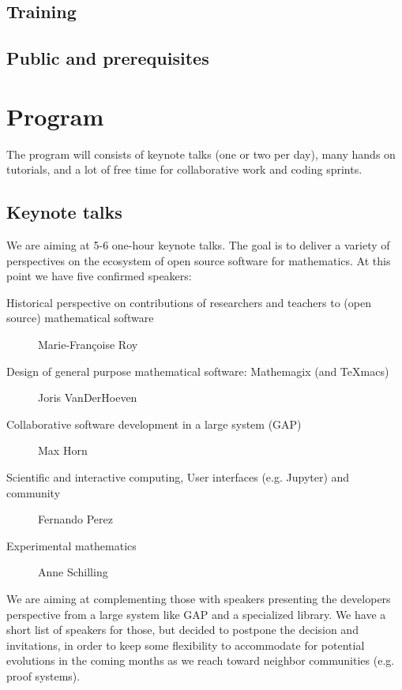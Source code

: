 \documentclass[12pt]{amsbook}
\begin{document}
\subsection{Training}

\subsection{}

\subsection{Public and prerequisites}



\section{Program}

The program will consists of keynote talks (one or two per day), many
hands on tutorials, and a lot of free time for collaborative work and
coding sprints.

\subsection{Keynote talks}

We are aiming at 5-6 one-hour keynote talks. The goal is to deliver a
variety of perspectives on the ecosystem of open source software for
mathematics. At this point we have five confirmed speakers:

\begin{description}
\item[Historical perspective on contributions of researchers and
  teachers to (open source) mathematical software]
  Marie-Françoise Roy
\item[Design of general purpose mathematical software: Mathemagix (and TeXmacs)]
  Joris VanDerHoeven
\item[Collaborative software development in a large system (GAP)]
  Max Horn
\item[Scientific and interactive computing, User interfaces (e.g. Jupyter) and community]
  Fernando Perez
\item[Experimental mathematics]
  Anne Schilling
\end{description}

We are aiming at complementing those with speakers presenting the
developers perspective from a large system like GAP and a specialized
library. We have a short list of speakers for those, but decided to
postpone the decision and invitations, in order to keep some
flexibility to accommodate for potential evolutions in the coming
months as we reach toward neighbor communities (e.g. proof systems).
\end{document}
